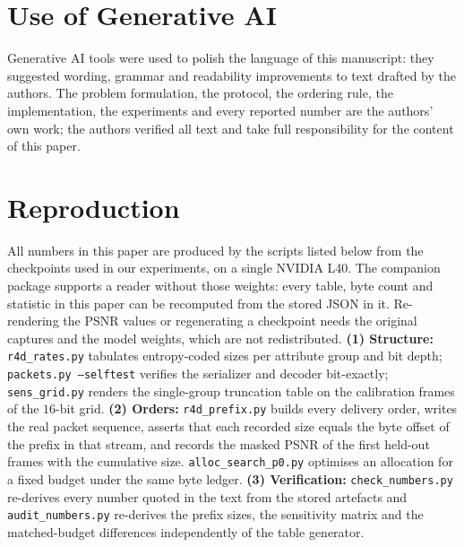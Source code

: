 \documentclass[lettersize,journal]{IEEEtran}
\begin{document}
\section*{Use of Generative AI}
\label{sec:genai}
Generative AI tools were used to polish the language of this manuscript: they
suggested wording, grammar and readability improvements to text drafted by the
authors. The problem formulation, the protocol, the ordering rule, the
implementation, the experiments and every reported number are the authors' own
work; the authors verified all text and take full responsibility for the content
of this paper.

\appendices
\section{Reproduction}
\label{app:repro}
All numbers in this paper are produced by the scripts listed below from the
checkpoints used in our experiments, on a single NVIDIA L40. The companion
package supports a reader without those weights: every table, byte count and
statistic in this paper can be recomputed from the stored JSON in it.
Re-rendering the PSNR values or regenerating a checkpoint needs the original
captures and the model weights, which are not redistributed.
\textbf{(1) Structure:} \texttt{r4d\_rates.py} tabulates entropy-coded sizes per
attribute group and bit depth; \texttt{packets.py --selftest} verifies the
serializer and decoder bit-exactly; \texttt{sens\_grid.py} renders the
single-group truncation table on the calibration frames of the $16$-bit grid.
\textbf{(2) Orders:} \texttt{r4d\_prefix.py} builds every delivery order, writes
the real packet sequence, asserts that each recorded size equals the byte offset
of the prefix in that stream, and records the masked PSNR of the first held-out
frames with the cumulative size. \texttt{alloc\_search\_p0.py} optimises an
allocation for a fixed budget under the same byte ledger.
\textbf{(3) Verification:} \texttt{check\_numbers.py} re-derives every number
quoted in the text from the stored artefacts and \texttt{audit\_numbers.py}
re-derives the prefix sizes, the sensitivity matrix and the matched-budget
differences independently of the table generator.

\clearpage


\end{document}
